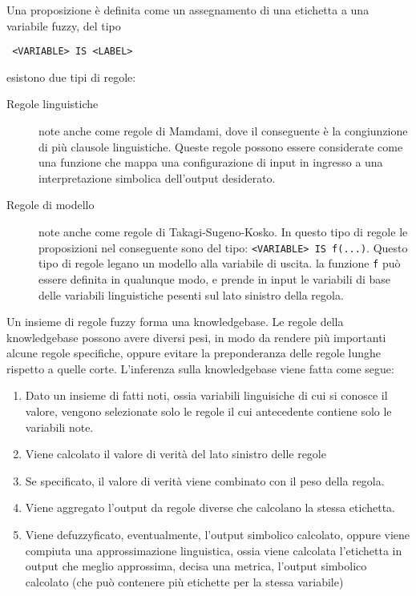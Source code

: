 Una proposizione è definita come un assegnamento di una etichetta a una variabile fuzzy, del tipo
\begin{verbatim}
 <VARIABLE> IS <LABEL>
\end{verbatim}

esistono due tipi di regole:
\begin{description}
 \item [Regole linguistiche] note anche come regole di Mamdami, dove il conseguente è la congiunzione di più clausole linguistiche. Queste regole possono essere considerate come una funzione che mappa una configurazione di input in ingresso a una interpretazione simbolica dell'output desiderato. 
 \item [Regole di modello] note anche come regole di Takagi-Sugeno-Kosko. In questo tipo di regole le proposizioni nel conseguente sono del tipo: \verb|<VARIABLE> IS f(...)|. Questo tipo di regole legano un modello alla variabile di uscita. la funzione \verb|f| può essere definita in qualunque modo, e prende in input le variabili di base delle variabili linguistiche pesenti sul lato sinistro della regola.

\end{description}


Un insieme di regole fuzzy forma una knowledgebase. Le regole della knowledgebase possono avere diversi pesi, in modo da rendere più importanti alcune regole specifiche, oppure evitare la preponderanza delle regole lunghe rispetto a quelle corte.
L'inferenza sulla knowledgebase viene fatta come segue: 

\begin{enumerate}
 \item Dato un insieme di fatti noti, ossia variabili linguisiche di cui si conosce il valore, vengono selezionate solo le regole il cui antecedente contiene solo le variabili note.
 \item Viene calcolato il valore di verità del lato sinistro delle regole
 \item Se specificato, il valore di verità viene combinato con il peso della regola.
 \item Viene aggregato l'output da regole diverse che calcolano la stessa etichetta.
 \item Viene defuzzyficato, eventualmente, l'output simbolico calcolato, oppure viene compiuta una approssimazione linguistica, ossia viene calcolata l'etichetta in output che meglio approssima, decisa una metrica, l'output simbolico calcolato (che può contenere più etichette per la stessa variabile)
\end{enumerate}

